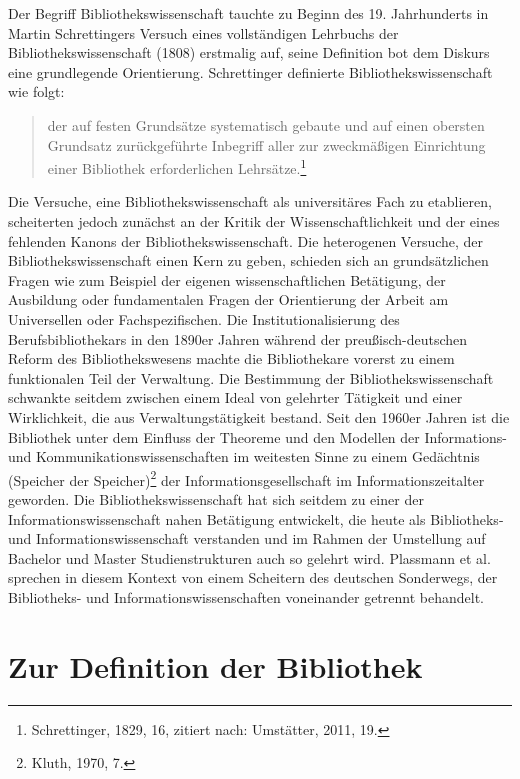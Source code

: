 \documentclass[a4paper,
fontsize=11pt,
oneside,
numbers=noperiodatend,
parskip=half-,
bibliography=totoc,
final
]{scrartcl}
\begin{document}
Der Begriff Bibliothekswissenschaft tauchte zu Beginn des 19.
Jahrhunderts in Martin Schrettingers Versuch eines vollständigen
Lehrbuchs der Bibliothekswissenschaft (1808) erstmalig auf, seine
Definition bot dem Diskurs eine grundlegende Orientierung. Schrettinger
definierte Bibliothekswissenschaft wie folgt:

\begin{quote}
der auf festen Grundsätze systematisch gebaute und auf einen obersten
Grundsatz zurückgeführte Inbegriff aller zur zweckmäßigen Einrichtung
einer Bibliothek erforderlichen Lehrsätze.\footnote{Schrettinger, 1829,
  16, zitiert nach: Umstätter, 2011, 19.}
\end{quote}

Die Versuche, eine Bibliothekswissenschaft als universitäres Fach zu
etablieren, scheiterten jedoch zunächst an der Kritik der
Wissenschaftlichkeit und der eines fehlenden Kanons der
Bibliothekswissenschaft. Die heterogenen Versuche, der
Bibliothekswissenschaft einen Kern zu geben, schieden sich an
grundsätzlichen Fragen wie zum Beispiel der eigenen wissenschaftlichen
Betätigung, der Ausbildung oder fundamentalen Fragen der Orientierung
der Arbeit am Universellen oder Fachspezifischen. Die
Institutionalisierung des Berufsbibliothekars in den 1890er Jahren
während der preußisch-deutschen Reform des Bibliothekswesens machte die
Bibliothekare vorerst zu einem funktionalen Teil der Verwaltung. Die
Bestimmung der Bibliothekswissenschaft schwankte seitdem zwischen einem
Ideal von gelehrter Tätigkeit und einer Wirklichkeit, die aus
Verwaltungstätigkeit bestand. Seit den 1960er Jahren ist die Bibliothek
unter dem Einfluss der Theoreme und den Modellen der Informations- und
Kommunikationswissenschaften im weitesten Sinne zu einem Gedächtnis
(Speicher der Speicher)\footnote{Kluth, 1970, 7.} der
Informationsgesellschaft im Informationszeitalter geworden. Die
Bibliothekswissenschaft hat sich seitdem zu einer der
Informationswissenschaft nahen Betätigung entwickelt, die heute als
Bibliotheks- und Informationswissenschaft verstanden und im Rahmen der
Umstellung auf Bachelor und Master Studienstrukturen auch so gelehrt
wird. Plassmann et al. sprechen in diesem Kontext von einem Scheitern
des deutschen Sonderwegs, der Bibliotheks- und
Informationswissenschaften voneinander getrennt behandelt.

\section*{Zur Definition der
Bibliothek}\label{zur-definition-der-bibliothek}
\end{document}

